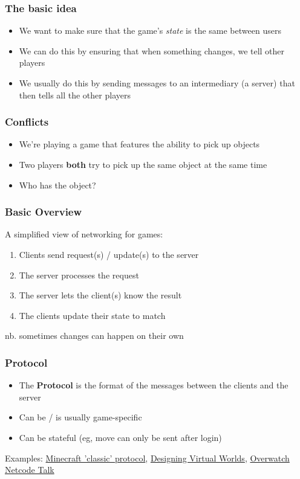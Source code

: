 \begin{frame}
	\frametitle{The basic idea}
	
	\begin{itemize}
		\item We want to make sure that the game's \textit{state} is the same between users
		\item We can do this by ensuring that when something changes, we tell other players
		\item We usually do this by sending messages to an intermediary (a server) that then tells all the other players
	\end{itemize}
	
\end{frame}

\begin{frame}
	\frametitle{Conflicts}
	
	\begin{itemize}
		\item We're playing a game that features the ability to pick up objects
		\item Two players \textbf{both} try to pick up the same object at the same time
		\item Who has the object?
	\end{itemize}
\end{frame}

\begin{frame}
	\frametitle{Basic Overview}
	
	A simplified view of networking for games:
	
	\begin{enumerate}
		\item Clients send request(s) / update(s) to the server
		\item The server processes the request
		\item The server lets the client(s) know the result
		\item The clients update their state to match
	\end{enumerate}
	
	nb. sometimes changes can happen on their own
\end{frame}

\begin{frame}
	\frametitle{Protocol}
	
	\begin{itemize}
		\item The \textbf{Protocol} is the format of the messages between the clients and the server
		\item Can be / is usually game-specific
		\item Can be stateful (eg, move can only be sent after login)
	\end{itemize}
	
	Examples: \href{https://minecraft.gamepedia.com/Classic_server_protocol}{Minecraft 'classic' protocol}, \href{https://www.amazon.com/Designing-Virtual-Worlds-Richard-Bartle/dp/0131018167}{Designing Virtual Worlds},
	\href{https://www.youtube.com/watch?v=W3aieHjyNvw}{Overwatch Netcode Talk}
\end{frame}

